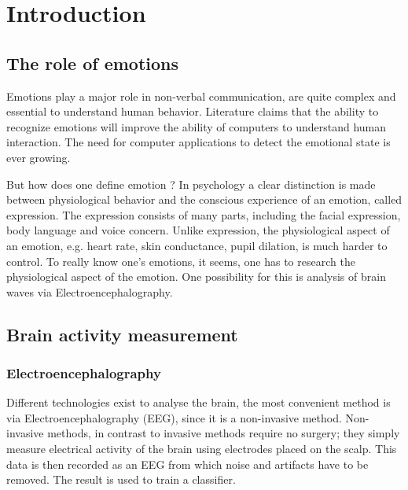 \chapter{Introduction}


\section{The role of emotions}
Emotions play a major role in non-verbal communication, are quite complex and essential to understand human behavior. Literature claims that the ability to recognize emotions will improve the ability of computers to understand human interaction\cite{CompRecognizeEmotion}. The need for computer applications to detect the emotional state is ever growing. 

\npar

But how does one define emotion ? In psychology a clear distinction is made between physiological behavior and the conscious experience of an emotion, called expression\cite{ExtendedPaper}. The expression consists of many parts, including the facial expression, body language and voice concern. Unlike expression, the physiological aspect of an emotion, e.g. heart rate, skin conductance, pupil dilation, is much harder to control. To really know one's emotions, it seems, one has to research the physiological aspect of the emotion. One possibility for this is analysis of brain waves via Electroencephalography\cite{EEGDatasets}.

\section{Brain activity measurement}

\subsection{Electroencephalography}
Different technologies exist to analyse the brain, the most convenient method is via Electroencephalography (EEG), since it is a non-invasive method. Non-invasive methods, in contrast to invasive methods require no surgery; they simply measure electrical activity of the brain using electrodes placed on the scalp. This data is then recorded as an EEG from which noise and artifacts have to be removed. The result is used to train a classifier. 


